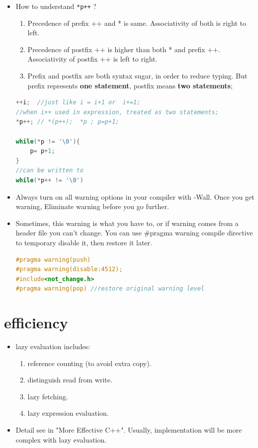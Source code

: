 \documentclass[a4paper,12pt,twoside]{book}
\begin{document}
\begin{itemize}
	\item How to understand \texttt{*p++} ?
	
	\begin{enumerate}
		\item Precedence of prefix ++ and * is same. Associativity of both is right to left.
		\item Precedence of postfix ++ is higher than both * and prefix ++. Associativity of postfix ++ is left to right.
		\item Prefix and postfix are both syntax sugar, in order to reduce typing.   But prefix represents \textbf{one statement}, postfix means \textbf{two statements};
	\end{enumerate}
	
\begin{lstlisting}[frame=single, language=c++]
++i;  //just like i = i+1 or  i+=1;
//when i++ used in expression, treated as two statements;
*p++; // *(p++);  *p ; p=p+1;

while(*p != '\0'){
	p= p+1;
}
//can be written to
while(*p++ != '\0')
\end{lstlisting}
	
	\item Always turn on all warning options in your compiler with -Wall. Once you get warning, Eliminate warning before you go further.
	
	\item Sometimes, this warning is what you have to, or if warning comes from a header file you can't change. You can use \#pragma warning compile directive to temporary disable it, then restore it later.
\begin{lstlisting}[frame=single, language=c++]
#pragma warning(push)
#pragma warning(disable:4512);
#include<not_change.h>
#pragma warning(pop) //restore original warning level
\end{lstlisting}
	
\end{itemize}

\section{efficiency}
\begin{itemize}
	\item  lazy evaluation includes:
	\begin{enumerate}
		\item reference counting (to avoid extra copy).
		\item distinguish read from write.
		\item lazy fetching.
		\item lazy expression evaluation.
	\end{enumerate}
	\item Detail see in "More Effective C++". Usually, implementation will be  more complex with lazy evaluation.
\end{itemize}
\end{document}
